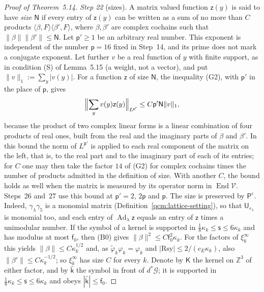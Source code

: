 \documentclass[11pt,letterpaper,reqno]{amsart}
\theoremstyle{definition}
\begin{document}
\begin{proof}[Proof of Theorem~5.14]
\emph{Step 22} (sizes).
A matrix valued function $\mathsf z(y)$ is said to have \emph{size} $\mathsf N$ if every entry of $\mathsf z(y)$ can be written as a sum of no more than $C$ products $\langle\beta,F\rangle\langle\beta',F\rangle$, where $\beta,\beta'$ are complex cochains such that $\|\beta\|\|\beta'\|\le\mathsf N$.
Let $\mathsf p'\ge1$ be an arbitrary real number.
This exponent is independent of the number $\mathsf p=16$ fixed in Step~14, and its prime does not mark a conjugate exponent.
Let further $v$ be a real function of $y$ with finite support, as in condition (S) of Lemma~5.15 (a weight, not a vector), and put $\|v\|_1:=\sum_y|v(y)|$.
For a function $\mathsf z$ of size $\mathsf N$, the inequality (G2), with $\mathsf p'$ in the place of $\mathsf p$, gives
\begin{equation*}
\Bigl\|\sum_yv(y)\mathsf z(y)\Bigr\|_{L^{\mathsf p'}}\le C\mathsf p'\mathsf N\|v\|_1,
\end{equation*}
because the product of two complex linear forms is a linear combination of four products of real ones, built from the real and the imaginary parts of $\beta$ and $\beta'$.
In this bound the norm of $L^{\mathsf p'}$ is applied to each real component of the matrix on the left, that is, to the real part and to the imaginary part of each of its entries;
for $C$ one may then take the factor $14$ of (G2) for complex cochains times the number of products admitted in the definition of size.
With another $C$, the bound holds as well when the matrix is measured by its operator norm in $\operatorname{End}\mathcal V$.
Steps~26 and~27 use this bound at $\mathsf p'=2$, $2\mathsf p$ and $\mathsf p$.
The size is preserved by $\mathsf P^\varepsilon$.
Indeed, $\gamma_\lambda\gamma_5$ is a monomial matrix (Definition~\ref{qcm:lattice-setting}), so that $\mathsf U_{r_\lambda}$ is monomial too, and each entry of $\operatorname{Ad}_\lambda\mathsf z$ equals an entry of $\mathsf z$ times a unimodular number.
If the symbol of a kernel is supported in $\frac18\kappa_k\le\mathsf s\le6\kappa_k$ and has modulus at most $\mathsf f_0$, then (B0) gives $\|\beta\|^2\le C\mathsf f_0^2\kappa_k$.
For the factors of $\xi_k^\infty$ this yields $\|\beta\|\le C\kappa_k^{1/2}$ and, as $\tilde\varphi_k\varphi_k=\varphi_k$ and $|\mathrm{Rsy}|\le2/(c_E\kappa_k)$, also $\|\beta'\|\le C\kappa_k^{-1/2}$; so $\xi_k^\infty$ has size $C$ for every $k$.
Denote by $\mathsf K$ the kernel on $\mathbb Z^3$ of either factor, and by $\hat{\mathsf k}$ the symbol in front of $d^*\mathcal G$; it is supported in $\frac18\kappa_k\le\mathsf s\le6\kappa_k$ and obeys $|\hat{\mathsf k}|\le\mathsf f_0$.

\end{proof}
\end{document}
